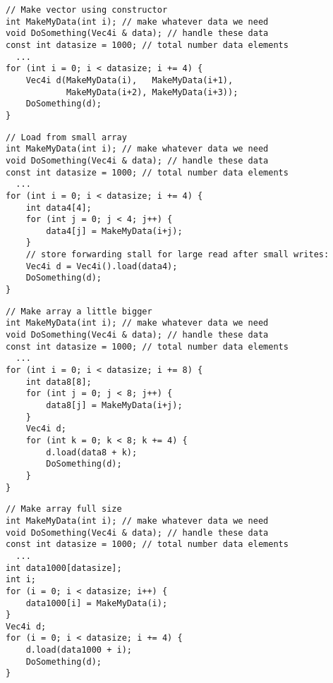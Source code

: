 \documentclass[vcl_manual.tex]{subfiles}
\begin{document}
\begin{example}
\label{exampleArrayLoopV}
\end{example}
\begin{lstlisting}[frame=single]
// Make vector using constructor
int MakeMyData(int i); // make whatever data we need
void DoSomething(Vec4i & data); // handle these data
const int datasize = 1000; // total number data elements
  ...
for (int i = 0; i < datasize; i += 4) {
    Vec4i d(MakeMyData(i),   MakeMyData(i+1),
            MakeMyData(i+2), MakeMyData(i+3));
    DoSomething(d);
}
\end{lstlisting}


\begin{example}
\label{exampleArrayLoopW}
\end{example}
\begin{lstlisting}[frame=single]
// Load from small array
int MakeMyData(int i); // make whatever data we need
void DoSomething(Vec4i & data); // handle these data
const int datasize = 1000; // total number data elements
  ...
for (int i = 0; i < datasize; i += 4) {
    int data4[4];
    for (int j = 0; j < 4; j++) {
        data4[j] = MakeMyData(i+j); 
    }
    // store forwarding stall for large read after small writes:
    Vec4i d = Vec4i().load(data4);
    DoSomething(d);
}
\end{lstlisting}


\begin{example}
\label{exampleArrayLoopX}
\end{example}
\begin{lstlisting}[frame=single]
// Make array a little bigger
int MakeMyData(int i); // make whatever data we need
void DoSomething(Vec4i & data); // handle these data
const int datasize = 1000; // total number data elements
  ...
for (int i = 0; i < datasize; i += 8) {
    int data8[8];
    for (int j = 0; j < 8; j++) {
        data8[j] = MakeMyData(i+j); 
    }
    Vec4i d;
    for (int k = 0; k < 8; k += 4) {
        d.load(data8 + k);
        DoSomething(d);
    }
}
\end{lstlisting}


\begin{example}
\label{exampleArrayLoopY}
\end{example}
\begin{lstlisting}[frame=single]
// Make array full size
int MakeMyData(int i); // make whatever data we need
void DoSomething(Vec4i & data); // handle these data
const int datasize = 1000; // total number data elements
  ...
int data1000[datasize];
int i;
for (i = 0; i < datasize; i++) {
    data1000[i] = MakeMyData(i); 
}
Vec4i d;
for (i = 0; i < datasize; i += 4) {
    d.load(data1000 + i);
    DoSomething(d);
}
\end{lstlisting}
\end{document}
